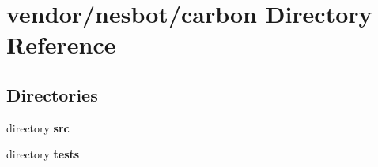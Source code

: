 \section{vendor/nesbot/carbon Directory Reference}
\label{dir_6315508c90d95650e02148a2649da34f}
\subsection*{Directories}
\begin{DoxyCompactItemize}
\item 
directory {\bf src}
\item 
directory {\bf tests}
\end{DoxyCompactItemize}

